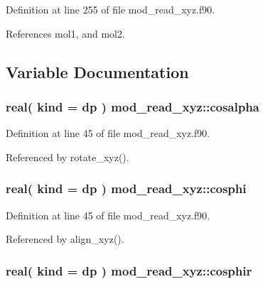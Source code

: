 Definition at line 255 of file mod\+\_\+read\+\_\+xyz.\+f90.



References mol1, and mol2.



\subsection{Variable Documentation}
\subsubsection[{\texorpdfstring{cosalpha}{cosalpha}}]{\setlength{\rightskip}{0pt plus 5cm}real( kind = dp ) mod\+\_\+read\+\_\+xyz\+::cosalpha}\hypertarget{namespacemod__read__xyz_a932bb57fc8636b50b040311a48f5f5ff}{}\label{namespacemod__read__xyz_a932bb57fc8636b50b040311a48f5f5ff}


Definition at line 45 of file mod\+\_\+read\+\_\+xyz.\+f90.



Referenced by rotate\+\_\+xyz().

\subsubsection[{\texorpdfstring{cosphi}{cosphi}}]{\setlength{\rightskip}{0pt plus 5cm}real( kind = dp ) mod\+\_\+read\+\_\+xyz\+::cosphi}\hypertarget{namespacemod__read__xyz_a9ce51beca027f9eeb6aa61284b343add}{}\label{namespacemod__read__xyz_a9ce51beca027f9eeb6aa61284b343add}


Definition at line 45 of file mod\+\_\+read\+\_\+xyz.\+f90.



Referenced by align\+\_\+xyz().

\subsubsection[{\texorpdfstring{cosphir}{cosphir}}]{\setlength{\rightskip}{0pt plus 5cm}real( kind = dp ) mod\+\_\+read\+\_\+xyz\+::cosphir}\hypertarget{namespacemod__read__xyz_a41be340f1c832ab4905f7e17f6ebe4ff}{}\label{namespacemod__read__xyz_a41be340f1c832ab4905f7e17f6ebe4ff}


